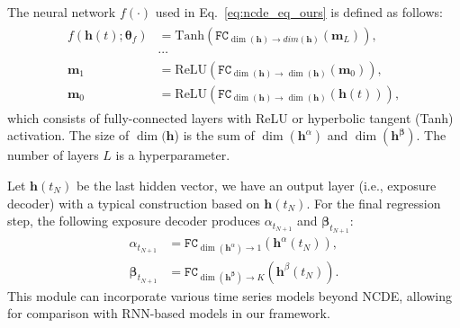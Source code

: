 \documentclass[sigconf]{acmart}
\begin{document}
The neural network $f(\cdot)$ used in Eq.~\eqref{eq:ncde_eq_ours} is defined as follows:
\begin{align}\begin{split}
f(\mathbf{h}(t);\mathbf{\theta}_f) &= \text{Tanh}(\texttt{FC}_{\dim(\mathbf{h}) \rightarrow dim(\mathbf{h})}(\mathbf{m}_{L})),\\
&\cdots\\
\mathbf{m}_{1} &= \text{ReLU}(\texttt{FC}_{\dim(\mathbf{h}) \rightarrow \dim(\mathbf{h})}(\mathbf{m}_0)),\\
\mathbf{m}_{0} &= \text{ReLU}(\texttt{FC}_{\dim(\mathbf{h}) \rightarrow \dim(\mathbf{h})}(\mathbf{h}(t))), \label{eq:function}
\end{split}\end{align}
which consists of fully-connected layers with ReLU or hyperbolic tangent (Tanh) activation. The size of $\dim(\mathbf{h}$) is the sum of $\dim(\mathbf{h}^{\alpha})$ and $\dim(\mathbf{h}^{\mathbf{\beta}})$. The number of layers $L$ is a hyperparameter.

Let $\mathbf{h}(t_N)$ be the last hidden vector, we have an output layer (i.e., exposure decoder) with a typical construction based on $\mathbf{h}(t_N)$. For the final regression step, the following exposure decoder produces $\alpha_{t_{N+1}}$ and $\mathbf{\bm{\beta}}_{t_{N+1}}$:
\begin{align}
    \alpha_{t_{N+1}} &= \texttt{FC}_{\dim(\mathbf{h}^{\alpha}) \rightarrow 1}(\mathbf{h}^{\alpha}(t_N)), \label{eq:alpha}\\
    \mathbf{\bm{\beta}}_{t_{N+1}} &= \texttt{FC}_{\dim(\mathbf{h}^{\mathbf{\beta}}) \rightarrow K}(\mathbf{h}^{\beta}(t_N)). \label{eq:beta}
\end{align}
This module can incorporate various time series models beyond NCDE, allowing for comparison with RNN-based models in our framework.
\end{document}
